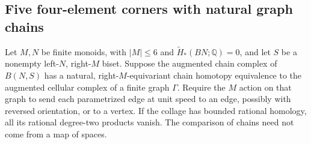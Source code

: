 \subsection{Five four-element corners with natural graph chains}

\begin{lemma}
\label{CP2:A-six-graph-chain-obstruction}
Let $M,N$ be finite monoids, with $|M|\le6$ and
$\widetilde H_*(BN;\mathbb Q)=0$, and let $S$ be a
nonempty left-$N$, right-$M$ biset.  Suppose the augmented
chain complex of $B(N,S)$ has a natural, right-$M$-equivariant
chain homotopy equivalence to the augmented cellular
complex of a finite graph $\Gamma$.  Require the $M$
action on that graph to send each parametrized edge at
unit speed to an edge, possibly with reversed orientation,
or to a vertex.  If the collage has bounded rational
homology, all its rational degree-two products vanish.
The comparison of chains need not come from a map of spaces.
\end{lemma}
